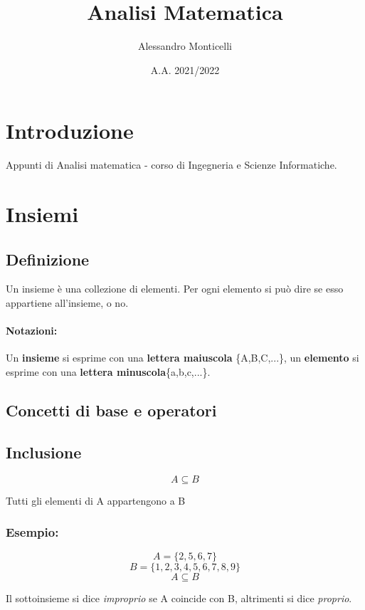 \documentclass{article}
\title{Analisi Matematica}
\author{Alessandro Monticelli}
\date{A.A. 2021/2022}
\begin{document}
  
\maketitle
\newpage
\tableofcontents
\newpage
\section*{Introduzione}
    Appunti di Analisi matematica - corso di Ingegneria e Scienze Informatiche.
\newpage
\section{Insiemi}
\subsection{Definizione}
    Un insieme è una collezione di elementi. Per ogni elemento si può dire se esso appartiene all'insieme, o no.
\paragraph{Notazioni:}Un \textbf{insieme} si esprime con una \textbf{lettera maiuscola} \{A,B,C,...\}, un \textbf{elemento} si esprime con una \textbf{lettera minuscola}\{a,b,c,...\}.

\subsection{Concetti di base e operatori}
\subsection{Inclusione}
    \begin{LARGE}
        \begin{equation*}
            A \subseteq B
        \end{equation*}
    \end{LARGE}
    Tutti gli elementi di A appartengono a B\newline
    
    \subsubsection*{Esempio:}
    
    \begin{LARGE}
        \begin{equation*}
            A = \{2,5,6,7\}
        \end{equation*}
        \begin{equation*}
            B = \{1,2,3,4,5,6,7,8,9\}
        \end{equation*}
        \begin{equation*}
            A \subseteq B
        \end{equation*}
    \end{LARGE}
    Il sottoinsieme si dice \textit{improprio} se A coincide con B, altrimenti si dice \textit{proprio}.
\end{document}
